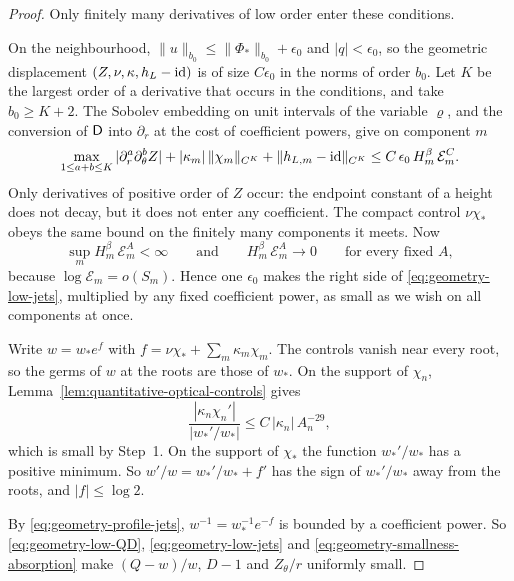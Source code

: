 \begin{proof}
Only finitely many derivatives of low order enter these conditions.

On the neighbourhood, $\|u\|_{b_0}\le\|\Phi_*\|_{b_0}+\epsilon_0$ and
$|q|<\epsilon_0$, so the geometric displacement
$(Z,\nu,\kappa,h_L-\mathrm{id})$ is of size $C\epsilon_0$ in the norms of
order $b_0$. Let $K$ be the largest order of a derivative that occurs
in the conditions, and take $b_0\ge K+2$. The Sobolev embedding on
unit intervals of the variable $\varrho$, and the conversion of
$\mathsf D$ into $\partial_r$ at the cost of coefficient powers, give on
component $m$
\begin{equation}\label{eq:geometry-low-jets}
 \max_{1\le a+b\le K}|\partial_r^a\partial_\theta^bZ|
 +|\kappa_m|\,\|\chi_m\|_{C^K}+\|h_{L,m}-\mathrm{id}\|_{C^K}
 \le C\,\epsilon_0\,H_m^\beta\,\mathcal E_m^{C}.
\end{equation}
Only derivatives of positive order of $Z$ occur: the endpoint constant
of a height does not decay, but it does not enter any coefficient.
The compact control $\nu\chi_*$ obeys the same bound on the finitely
many components it meets. Now
\begin{equation}\label{eq:geometry-smallness-absorption}
 \sup_mH_m^\beta\,\mathcal E_m^{A}<\infty
 \qquad\text{and}\qquad
 H_m^\beta\,\mathcal E_m^{A}\longrightarrow0
 \qquad\text{for every fixed }A,
\end{equation}
because $\log\mathcal E_m=o(S_m)$. Hence one $\epsilon_0$ makes the
right side of \eqref{eq:geometry-low-jets}, multiplied by any fixed
coefficient power, as small as we wish on all components at once.

Write $w=w_*e^f$ with $f=\nu\chi_*+\sum_m\kappa_m\chi_m$. The controls
vanish near every root, so the germs of $w$ at the roots are those of
$w_*$. On the support of $\chi_n$,
Lemma~\ref{lem:quantitative-optical-controls} gives
\[
 \frac{|\kappa_n\chi_n'|}{|w_*'/w_*|}\le C\,|\kappa_n|\,A_n^{-29},
\]
which is small by Step~1. On the support of $\chi_*$ the function
$w_*'/w_*$ has a positive minimum. So $w'/w=w_*'/w_*+f'$ has the sign
of $w_*'/w_*$ away from the roots, and $|f|\le\log2$.

By \eqref{eq:geometry-profile-jets}, $w^{-1}=w_*^{-1}e^{-f}$ is
bounded by a coefficient power. So \eqref{eq:geometry-low-QD},
\eqref{eq:geometry-low-jets} and
\eqref{eq:geometry-smallness-absorption} make $(Q-w)/w$, $D-1$ and
$Z_\theta/r$ uniformly small.
\end{proof}

